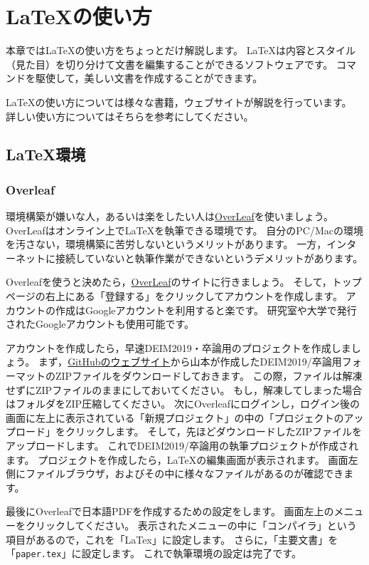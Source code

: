 \section{LaTeXの使い方}
本章ではLaTeXの使い方をちょっとだけ解説します。
LaTeXは内容とスタイル（見た目）を切り分けて文書を編集することができるソフトウェアです。
コマンドを駆使して，美しい文書を作成することができます。

LaTeXの使い方については様々な書籍，ウェブサイトが解説を行っています。
詳しい使い方についてはそちらを参考にしてください。


\subsection{LaTeX環境}
\subsubsection{Overleaf}
環境構築が嫌いな人，あるいは楽をしたい人は\href{https://ja.overleaf.com}{OverLeaf}を使いましょう。
OverLeafはオンライン上でLaTeXを執筆できる環境です。
自分のPC/Macの環境を汚さない，環境構築に苦労しないというメリットがあります。
一方，インターネットに接続していないと執筆作業ができないというデメリットがあります。

Overleafを使うと決めたら，\href{https://ja.overleaf.com}{OverLeaf}のサイトに行きましょう。
そして，トップページの右上にある「登録する」をクリックしてアカウントを作成します。
アカウントの作成はGoogleアカウントを利用すると楽です。
研究室や大学で発行されたGoogleアカウントも使用可能です。

アカウントを作成したら，早速DEIM2019・卒論用のプロジェクトを作成しましょう。
まず，\href{https://github.com/ymmt3-lab/DEIM-and-Thesis/archive/master.zip}{GitHubのウェブサイト}から山本が作成したDEIM2019/卒論用フォーマットのZIPファイルをダウンロードしておきます。
この際，ファイルは解凍せずにZIPファイルのままにしておいてください。
もし，解凍してしまった場合はフォルダをZIP圧縮してください。
次にOverleafにログインし，ログイン後の画面に左上に表示されている「新規プロジェクト」の中の「プロジェクトのアップロード」をクリックします。
そして，先ほどダウンロードしたZIPファイルをアップロードします。
これでDEIM2019/卒論用の執筆プロジェクトが作成されます。
プロジェクトを作成したら，LaTeXの編集画面が表示されます。
画面左側にファイルブラウザ，およびその中に様々なファイルがあるのが確認できます。

最後にOverleafで日本語PDFを作成するための設定をします。
画面左上のメニューをクリックしてください。
表示されたメニューの中に「コンパイラ」という項目があるので，これを「LaTex」に設定します。
さらに，「主要文書」を「\texttt{paper.tex}」に設定します。
これで執筆環境の設定は完了です。


